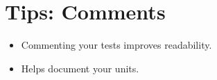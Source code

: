 \documentclass{article}
\begin{document}
\sloppy
\section{Tips: Comments}
\begin{itemize}
    \item Commenting your tests improves readability.
    \item Helps document your units.
\end{itemize}
\end{document}
